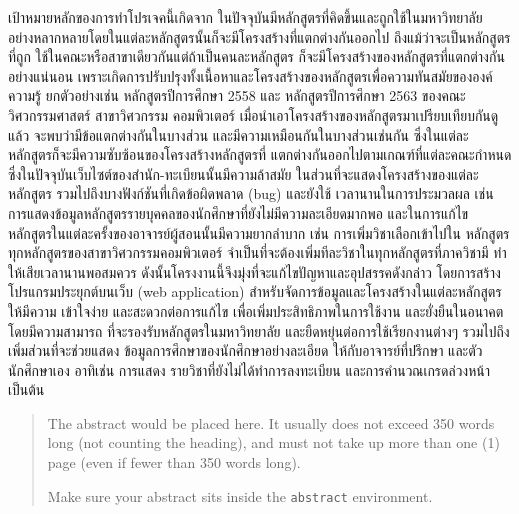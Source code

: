 \maketitle
\makesignature

\ifproject
\begin{abstractTH}
    เป้าหมายหลักของการทําโปรเจคนี้เกิดจาก ในปัจจุบันมีหลักสูตรที่คิดขึ้นและถูกใช้ในมหาวิทยาลัย
    อย่างหลากหลายโดยในแต่ละหลักสูตรนั้นก็จะมีโครงสร้างที่แตกต่างกันออกไป ถึงแม้ว่าจะเป็นหลักสูตรที่ถูก
    ใช้ในคณะหรือสาขาเดียวกันแต่ถ้าเป็นคนละหลักสูตร ก็จะมีโครงสร้างของหลักสูตรที่แตกต่างกันอย่างแน่นอน
    เพราะเกิดการปรับปรุงทั้งเนื้อหาและโครงสร้างของหลักสูตรเพื่อความทันสมัยขององค์ความรู้ ยกตัวอย่างเช่น 
    หลักสูตรปีการศึกษา 2558 และ หลักสูตรปีการศึกษา 2563 ของคณะวิศวกรรมศาสตร์ สาขาวิศวกรรม
    คอมพิวเตอร์ เมื่อนําเอาโครงสร้างของหลักสูตรมาเปรียบเทียบกันดูแล้ว จะพบว่ามีข้อแตกต่างกันในบางส่วน 
    และมีความเหมือนกันในบางส่วนเช่นกัน ซึ่งในแต่ละหลักสูตรก็จะมีความซับซ้อนของโครงสร้างหลักสูตรที่
    แตกต่างกันออกไปตามเกณฑ์ที่แต่ละคณะกําหนด ซึ่งในปัจจุบันเว็บไซต์ของสํานัก-ทะเบียนนั้นมีความล้าสมัย
    ในส่วนที่จะแสดงโครงสร้างของแต่ละหลักสูตร รวมไปถึงบางฟังก์ชันที่เกิดข้อผิดพลาด (bug) และยังใช้
    เวลานานในการประมวลผล เช่น การแสดงข้อมูลหลักสูตรรายบุคคลของนักศึกษาที่ยังไม่มีความละเอียดมากพอ 
    และในการแก้ไขหลักสูตรในแต่ละครั้งของอาจารย์ผู้สอนนั้นมีความยากลําบาก เช่น การเพิ่มวิชาเลือกเข้าไปใน
    หลักสูตรทุกหลักสูตรของสาขาวิศวกรรมคอมพิวเตอร์ จําเป็นที่จะต้องเพิ่มทีละวิชาในทุกหลักสูตรที่ภาควิชามี 
    ทําให้เสียเวลานานพอสมควร ดังนั้นโครงงานนี้จึงมุ่งที่จะแก้ไขปัญหาและอุปสรรคดังกล่าว โดยการสร้าง
    โปรแกรมประยุกต์บนเว็บ (web application) สําหรับจัดการข้อมูลและโครงสร้างในแต่ละหลักสูตรให้มีความ
    เข้าใจง่าย และสะดวกต่อการแก้ไข เพื่อเพิ่มประสิทธิภาพในการใช้งาน และยั่งยืนในอนาคต โดยมีความสามารถ
    ที่จะรองรับหลักสูตรในมหาวิทยาลัย และยืดหยุ่นต่อการใช้เรียกงานต่างๆ รวมไปถึงเพิ่มส่วนที่จะช่วยแสดง
    ข้อมูลการศึกษาของนักศึกษาอย่างละเอียด ให้กับอาจารย์ที่ปรึกษา และตัวนักศึกษาเอง อาทิเช่น การแสดง
    รายวิชาที่ยังไม่ได้ทําการลงทะเบียน และการคํานวณเกรดล่วงหน้า เป็นต้น 
\end{abstractTH}

\begin{abstract}
The abstract would be placed here. It usually does not exceed 350 words
long (not counting the heading), and must not take up more than one (1) page
(even if fewer than 350 words long).

Make sure your abstract sits inside the \texttt{abstract} environment.
\end{abstract}

